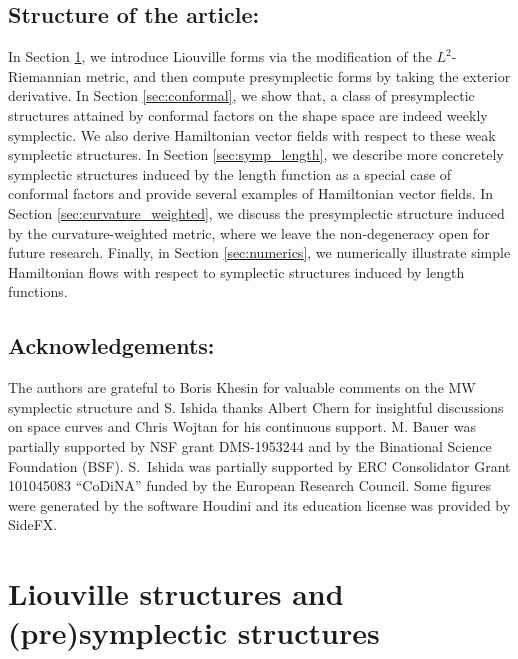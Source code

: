 \documentclass[12pt]{amsart}
\theoremstyle{definition}
\begin{document}
\subsection*{Structure of the article:}
In Section \ref{sec:Liouville_and_presymplectic}, we introduce Liouville forms via the modification of the $L^2$-Riemannian metric, and then compute presymplectic forms by taking the exterior derivative. In Section \ref{sec:conformal}, we show that, a class of presymplectic structures attained by conformal factors on the shape space are indeed weekly symplectic. We also derive Hamiltonian vector fields with respect to these weak symplectic structures. In Section \ref{sec:symp_length}, we describe more concretely symplectic structures induced by the length function as a special case of conformal factors and provide several examples of Hamiltonian  vector fields. In Section \ref{sec:curvature_weighted}, we discuss the presymplectic structure induced by the curvature-weighted metric, where we leave the non-degeneracy open for future research.
Finally, in Section \ref{sec:numerics}, we numerically illustrate simple Hamiltonian flows with respect to symplectic structures induced by length functions.

\subsection*{Acknowledgements:}
The authors are grateful to Boris  Khesin for valuable comments on the MW symplectic structure and S. Ishida thanks Albert Chern for insightful discussions on space curves and Chris Wojtan for his continuous support.
M. Bauer was partially supported by NSF grant DMS-1953244 and by the Binational Science Foundation (BSF). S.~Ishida was partially supported by ERC Consolidator Grant 101045083 ``CoDiNA'' funded by the European Research Council. Some figures were generated by the software Houdini and its education license was provided by SideFX.
\section{Liouville structures and (pre)symplectic structures}\label{sec:Liouville_and_presymplectic}
\end{document}
